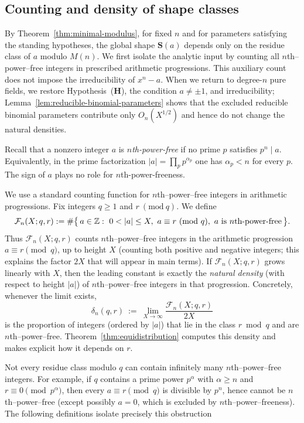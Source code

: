 \documentclass[12pt,a4paper,oneside]{amsart}
\theoremstyle{definition}
\begin{document}
\subsection{Counting and density of shape classes}\label{subsec:counting}
By Theorem~\ref{thm:minimal-modulus}, for fixed $n$ and for parameters satisfying the standing hypotheses, the global shape $\mathbf S(a)$ depends only on the residue class of $a$ modulo $M(n)$. We first isolate the analytic input by counting all $n$th--power--free integers in prescribed arithmetic progressions. This auxiliary count does not impose the irreducibility of $x^n-a$. When we return to degree-$n$ pure fields, we restore Hypothesis~\textup{(\textbf{H})}, the condition $a\neq\pm1$, and irreducibility; Lemma~\ref{lem:reducible-binomial-parameters} shows that the excluded reducible binomial parameters contribute only $O_n(X^{1/2})$ and hence do not change the natural densities.

Recall that a nonzero integer $a$ is \emph{$n$th-power-free} if no prime $p$ satisfies $p^n\mid a$. Equivalently, in the prime factorization $|a|=\prod_p p^{\alpha_p}$ one has $\alpha_p<n$ for every $p$. The sign of $a$ plays no role for $n$th-power-freeness.

We use a standard counting function for $n$th--power--free integers in arithmetic progressions. Fix integers $q\ge1$ and $r\ (\mathrm{mod}\ q)$. We define
\[
\mathcal F_n(X;q,r)
:=\#\bigl\{\,a\in\Bbb Z:\ 0<|a|\le X,\ a\equiv r\ (\mathrm{mod}\ q),\ a\ \text{is $n$th-power-free}\,\bigr\}.
\]
Thus $\mathcal F_n(X;q,r)$ counts $n$th--power--free integers in the arithmetic progression $a\equiv r\pmod q$, up to height $X$ (counting both positive and negative integers; this explains the factor $2X$ that will appear in main terms).  If $\mathcal F_n(X;q,r)$ grows linearly with $X$, then the leading constant is exactly the \emph{natural density} (with respect to height $|a|$) of $n$th--power--free integers in that progression.  Concretely, whenever the limit exists,
\[
\delta_n(q,r)\ :=\ \lim_{X\to\infty}\frac{\mathcal F_n(X;q,r)}{2X}
\]
is the proportion of integers (ordered by $|a|$) that lie in the class $r\bmod q$ and are
$n$th--power--free.  Theorem~\ref{thm:equidistribution} computes this density and makes explicit how it depends on $r$.

Not every residue class modulo $q$ can contain infinitely many $n$th--power--free integers. For example, if $q$ contains a prime power $p^\alpha$ with $\alpha\ge n$ and $r\equiv0\pmod{p^\alpha}$, then every $a\equiv r\pmod q$ is divisible by $p^n$, hence cannot be $n$th--power--free (except possibly $a=0$, which is excluded by $n$th--power--freeness).  The following definitions isolate precisely this obstruction
\end{document}
